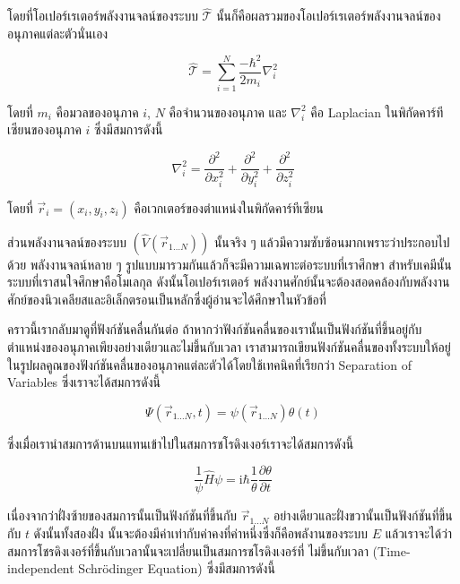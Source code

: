 \noindent โดยที่โอเปอร์เรเตอร์พลังงานจลน์ของระบบ $\hat{\mathscr{T}}$ นั้นก็คือผลรวมของโอเปอร์เรเตอร์พลังงานจลน์ของอนุภาคแต่ละตัวนั่นเอง

\begin{equation}
    \label{eq:kinetic_operator}
    \hat{\mathscr{T}} = \sum_{i=1}^N \frac{-\hbar^2}{2 m_i} \nabla_i^2
\end{equation}

\noindent โดยที่ $m_i$ คือมวลของอนุภาค $i$, $N$ คือจำนวนของอนุภาค และ $\nabla_i^2$ คือ Laplacian ในพิกัดคาร์ทีเซียนของอนุภาค
$i$ ซึ่งมีสมการดังนี้

\begin{equation}
    \label{eq:nabla}
    \nabla_i^2
    =
    \frac{\partial^2}{\partial x_i^2}
    + \frac{\partial^2}{\partial y_i^2}
    + \frac{\partial^2}{\partial z_i^2}
\end{equation}

\noindent โดยที่ $\vec{r}_i = \left(x_i, y_i, z_i\right)$ คือเวกเตอร์ของตำแหน่งในพิกัดคาร์ทีเซียน

ส่วนพลังงานจลน์ของระบบ $(\hat{V}\left(\vec{r}_{1 \ldots N}\right))$ นั้นจริง ๆ แล้วมีความซับซ้อนมากเพราะว่าประกอบไปด้วย%
พลังงานจลน์หลาย ๆ รูปแบบมารวมกันแล้วก็จะมีความเฉพาะต่อระบบที่เราศึกษา สำหรับเคมีนั้นระบบที่เราสนใจศึกษาคือโมเลกุล ดังนั้นโอเปอร์เรเตอร์%
พลังงานศักย์นั้นจะต้องสอดคล้องกับพลังงานศักย์ของนิวเคลียสและอิเล็กตรอนเป็นหลักซึ่งผู้อ่านจะได้ศึกษาในหัวข้อที่

คราวนี้เรากลับมาดูที่ฟังก์ชันคลื่นกันต่อ ถ้าหากว่าฟังก์ชันคลื่นของเรานั้นเป็นฟังก์ชันที่ขึ้นอยู่กับตำแหน่งของอนุภาคเพียงอย่างเดียวและไม่ขึ้นกับเวลา
เราสามารถเขียนฟังก์ชันคลื่นของทั้งระบบให้อยู่ในรูปผลคูณของฟังก์ชันคลื่นของอนุภาคแต่ละตัวได้โดยใช้เทคนิคที่เรียกว่า Separation of Variables
ซึ่งเราจะได้สมการดังนี้

\begin{equation}
    \Psi\left(\vec{r}_{1 \ldots N}, t\right)
    =
    \psi\left(\vec{r}_{1 \ldots N}\right) \theta(t)
\end{equation}

\noindent ซึ่งเมื่อเรานำสมการด้านบนแทนเข้าไปในสมการชโรดิงเงอร์เราจะได้สมการดังนี้

\begin{equation}
    \frac{1}{\psi} \hat{H} \psi
    =
    \mathrm{i} \hbar
    \frac{1}{\theta}
    \frac{\partial \theta}{\partial t}
\end{equation}

เนื่องจากว่าฝั่งซ้ายของสมการนั้นเป็นฟังก์ชันที่ขึ้นกับ $\vec{r}_{1 . . . N}$ อย่างเดียวและฝั่งขวานั้นเป็นฟังก์ชันที่ขึ้นกับ $t$ ดังนั้นทั้งสองฝั่ง%
นั้นจะต้องมีค่าเท่ากับค่าคงที่ค่าหนึ่งซึ่งก็คือพลังานของระบบ $E$ แล้วเราจะได้ว่าสมการโชรดิงเงอร์ที่ขึ้นกับเวลานั้นจะเปลี่ยนเป็นสมการชโรดิงเงอร์ที่%
ไม่ขึ้นกับเวลา (Time-independent Schr\"{o}dinger Equation) ซึ่งมีสมการดังนี้

